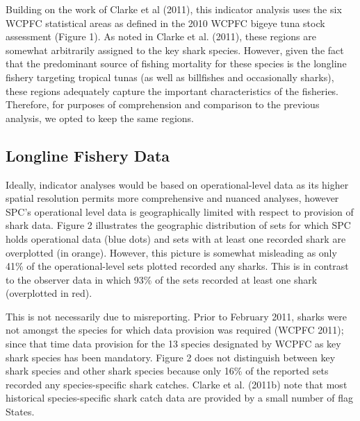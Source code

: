 \documentclass[12pt]{SCreport}
\begin{document}
Building on the work of Clarke et al (2011), this indicator analysis uses the six WCPFC statistical areas as defined in the 2010 WCPFC bigeye tuna stock assessment (Figure 1). As noted in Clarke et al. (2011), these regions are somewhat arbitrarily assigned to the key shark species. However, given the fact that the predominant source of fishing mortality for these species is the longline fishery targeting tropical tunas (as well as billfishes and occasionally sharks), these regions adequately capture the important characteristics of the fisheries. Therefore, for purposes of comprehension and comparison to the previous analysis, we opted to keep the same regions. 



\subsection{Longline Fishery Data}
  
  
Ideally, indicator analyses would be based on operational-level data as its higher spatial resolution permits more comprehensive and nuanced analyses, however SPC's operational level data is geographically limited with respect to provision of shark data.  Figure 2 illustrates the geographic distribution of sets for which SPC holds operational data (blue dots) and sets with at least one recorded shark are overplotted (in orange). However, this picture is somewhat misleading as only 41\% of the operational-level sets plotted recorded any sharks. This is in contrast to the observer data in which 93\% of the sets recorded at least one shark (overplotted in red).

This is not necessarily due to misreporting. Prior to February 2011, sharks were not amongst the species for which data provision was required (WCPFC 2011); since that time data provision for the 13 species designated by WCPFC as key shark species has been mandatory. Figure 2 does not distinguish between key shark species and other shark species because only 16\% of the reported sets recorded any species-specific shark catches. Clarke et al. (2011b) note that most historical species-specific shark catch data are provided by a small number of flag States.
\end{document}
